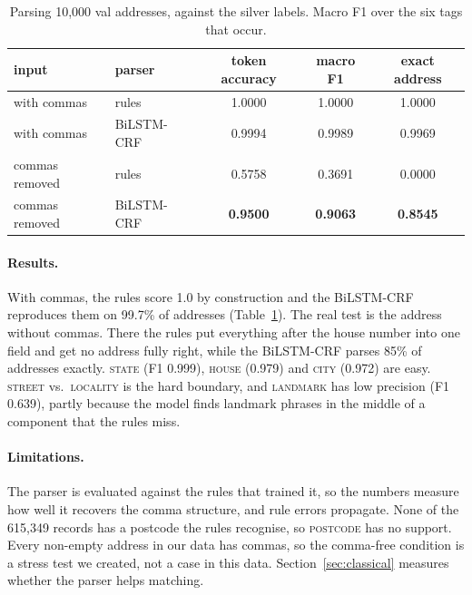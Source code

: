 \begin{table}[h]
\centering\small
\begin{tabular}{llccc}
\toprule
input & parser & token accuracy & macro F1 & exact address \\
\midrule
with commas    & rules      & 1.0000 & 1.0000 & 1.0000 \\
with commas    & BiLSTM-CRF & 0.9994 & 0.9989 & 0.9969 \\
commas removed & rules      & 0.5758 & 0.3691 & 0.0000 \\
commas removed & BiLSTM-CRF & \textbf{0.9500} & \textbf{0.9063} & \textbf{0.8545} \\
\bottomrule
\end{tabular}
\caption{Parsing 10,000 val addresses, against the silver labels. Macro F1 over the six tags that occur.}
\label{tab:parser}
\end{table}

\paragraph{Results.} With commas, the rules score 1.0 by construction and the BiLSTM-CRF reproduces them on
99.7\% of addresses (Table~\ref{tab:parser}). The real test is the address without commas. There the rules
put everything after the house number into one field and get no address fully right, while the BiLSTM-CRF
parses 85\% of addresses exactly. \textsc{state} (F1 0.999), \textsc{house} (0.979) and \textsc{city} (0.972)
are easy. \textsc{street} vs.\ \textsc{locality} is the hard boundary, and \textsc{landmark} has low precision
(F1 0.639), partly because the model finds landmark phrases in the middle of a component that the rules miss.

\paragraph{Limitations.} The parser is evaluated against the rules that trained it, so the numbers measure
how well it recovers the comma structure, and rule errors propagate. None of the 615,349 records has a
postcode the rules recognise, so \textsc{postcode} has no support. Every non-empty address in our data has
commas, so the comma-free condition is a stress test we created, not a case in this data.
Section~\ref{sec:classical} measures whether the parser helps matching.
